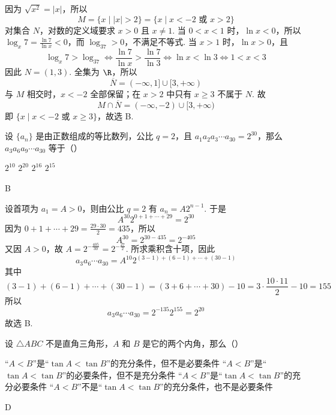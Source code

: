 \documentclass[UTF8,a4paper,oneside,11pt]{ctexbook}
\begin{document}
\begin{solution}
因为 \(\sqrt{x^2}=|x|\)，所以
\[
M=\{x\mid |x|>2\}=\{x\mid x<-2\text{ 或 }x>2\}
\]
对集合 \(N\)，对数的定义域要求 \(x>0\) 且 \(x\ne1\). 当 \(0<x<1\) 时，\(\ln x<0\)，所以 \(\log_x7=\frac{\ln7}{\ln x}<0\)，而 \(\log_37>0\)，不满足不等式. 当 \(x>1\) 时，\(\ln x>0\)，且
\[
\log_x7>\log_37\Longleftrightarrow \frac{\ln7}{\ln x}>\frac{\ln7}{\ln3}
\Longleftrightarrow \ln x<\ln3
\Longleftrightarrow 1<x<3
\]
因此 \(N=(1,3)\). 全集为 \(\R\)，所以
\[
\overline N=(-\infty,1]\cup[3,+\infty)
\]
与 \(M\) 相交时，\(x<-2\) 全部保留；在 \(x>2\) 中只有 \(x\geqslant3\) 不属于 \(N\). 故
\[
M\cap\overline N=(-\infty,-2)\cup[3,+\infty)
\]
即 \(\{x\mid x<-2\text{ 或 }x\geqslant3\}\)，故选 B.
\end{solution}

\begin{problem}
设 \(\{a_n\}\) 是由正数组成的等比数列，公比 \(q=2\)，且 \(a_1a_2a_3\cdots a_{30}=2^{30}\)，那么 \(a_3a_6a_9\cdots a_{30}\) 等于（\quad）

\choices
    {\(2^{10}\)}
    {\(2^{20}\)}
    {\(2^{16}\)}
    {\(2^{15}\)}
\end{problem}

\begin{answer}
B
\end{answer}

\begin{solution}
设首项为 \(a_1=A>0\)，则由公比 \(q=2\) 有 \(a_n=A2^{n-1}\). 于是
\[
A^{30}2^{0+1+\cdots+29}=2^{30}
\]
因为 \(0+1+\cdots+29=\frac{29\cdot30}{2}=435\)，所以
\[
A^{30}=2^{30-435}=2^{-405}
\]
又因 \(A>0\)，故 \(A=2^{-\frac{405}{30}}=2^{-\frac{27}{2}}\). 所求乘积含十项，因此
\[
a_3a_6\cdots a_{30}=A^{10}2^{(3-1)+(6-1)+\cdots+(30-1)}
\]
其中
\[
(3-1)+(6-1)+\cdots+(30-1)=(3+6+\cdots+30)-10=3\cdot\frac{10\cdot11}{2}-10=155
\]
所以
\[
a_3a_6\cdots a_{30}=2^{-135}2^{155}=2^{20}
\]
故选 B.
\end{solution}

\begin{problem}
设 \(\triangle ABC\) 不是直角三角形，\(A\) 和 \(B\) 是它的两个内角，那么（\quad）

\choices
    {“\(A<B\)”是“\(\tan A<\tan B\)”的充分条件，但不是必要条件}
    {“\(A<B\)”是“\(\tan A<\tan B\)”的必要条件，但不是充分条件}
    {“\(A<B\)”是“\(\tan A<\tan B\)”的充分必要条件}
    {“\(A<B\)”不是“\(\tan A<\tan B\)”的充分条件，也不是必要条件}
\end{problem}

\begin{answer}
D
\end{answer}
\end{document}

